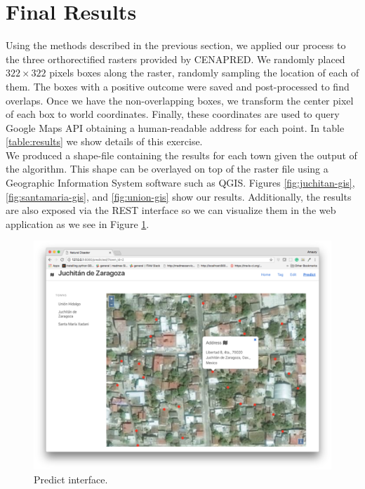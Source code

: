 \section{Final Results}

Using the methods described in the previous section, we applied our process to the three orthorectified rasters provided by CENAPRED. We randomly placed $322\times322$ pixels boxes along the raster, randomly sampling the location of each of them. The boxes with a positive outcome were saved and post-processed to find overlaps. Once we have the non-overlapping boxes, we transform the center pixel of each box to world coordinates. Finally, these coordinates are used to query Google Maps API obtaining a human-readable address for each point. In table \ref{table:results} we show details of this exercise.\\

We produced a shape-file containing the results for each town given the output of the algorithm. This shape can be overlayed on top of the raster file using a Geographic Information System software such as QGIS. Figures \ref{fig:juchitan-gis},\ref{fig:santamaria-gis}, and \ref{fig:union-gis} show our results. Additionally, the results are also exposed via the REST interface so we can visualize them in the web application as we see in Figure \ref{fig:predict}.\\

\begin{figure}[!h]
  \centering
  \includegraphics[width=1\textwidth]{images/small-app-predict.png}
  \caption{Predict interface.}
  \label{fig:predict}
\end{figure}


